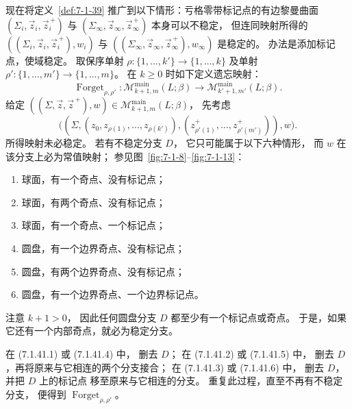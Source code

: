 现在将定义~\ref{def:7-1-39}
推广到以下情形：亏格零带标记点的有边黎曼曲面
$(\Sigma_i,\vec z_i,\vec z_i^{\, +})$ 与
$(\Sigma_\infty,\vec z_\infty,\vec z_\infty^{\, +})$
本身可以不稳定，
但连同映射所得的
$((\Sigma_i,\vec z_i,\vec z_i^{\, +}),w_i)$ 与
$((\Sigma_\infty,\vec z_\infty,\vec z_\infty^{\, +}),w_\infty)$
是稳定的。
办法是添加标记点，使域稳定。
取保序单射
$\rho\colon\{1,\ldots,k'\}\to\{1,\ldots,k\}$
及单射
$\rho'\colon\{1,\ldots,m'\}\to\{1,\ldots,m\}$。
在 $k\ge0$ 时如下定义遗忘映射：
\[
\operatorname{Forget}_{\rho,\rho'}\colon
\mathcal M^{\mathrm{main}}_{k+1,m}(L;\beta)
\longrightarrow
\mathcal M^{\mathrm{main}}_{k'+1,m'}(L;\beta).
\]
给定
$((\Sigma,\vec z,\vec z^{\, +}),w)
\in\mathcal M^{\mathrm{main}}_{k+1,m}(L;\beta)$，
先考虑
\[
\bigl(
(\Sigma,
(z_0,z_{\rho(1)},\ldots,z_{\rho(k')}),
(z^+_{\rho'(1)},\ldots,z^+_{\rho'(m')})),w
\bigr).
\]
所得映射未必稳定。
若有不稳定分支 $D$，
它只可能属于以下六种情形，
而 $w$ 在该分支上必为常值映射；
参见图~\ref{fig:7-1-8}--\ref{fig:7-1-13}：
\begin{enumerate}[label=\textup{(7.1.41.\arabic*)},leftmargin=6em]
\item\label{eq:7-1-41-1} 球面，有一个奇点、没有标记点；
\item\label{eq:7-1-41-2} 球面，有两个奇点、没有标记点；
\item\label{eq:7-1-41-3} 球面，有一个奇点、一个标记点；
\item\label{eq:7-1-41-4} 圆盘，有一个边界奇点、没有标记点；
\item\label{eq:7-1-41-5} 圆盘，有两个边界奇点、没有标记点；
\item\label{eq:7-1-41-6} 圆盘，有一个边界奇点、一个边界标记点。
\end{enumerate}
注意 $k+1>0$，
因此任何圆盘分支 $D$ 都至少有一个标记点或奇点。
于是，如果它还有一个内部奇点，就必为稳定分支。

在 (7.1.41.1) 或 (7.1.41.4) 中，
删去 $D$；
在 (7.1.41.2) 或 (7.1.41.5) 中，
删去 $D$，再将原来与它相连的两个分支接合；
在 (7.1.41.3) 或 (7.1.41.6) 中，
删去 $D$，并把 $D$ 上的标记点
移至原来与它相连的分支。
重复此过程，直至不再有不稳定分支，
便得到 $\operatorname{Forget}_{\rho,\rho'}$。

